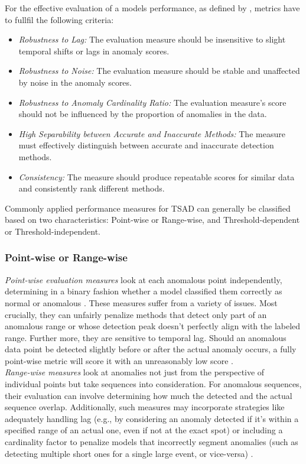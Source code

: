 \documentclass[12pt,oneside]{article}
\begin{document}
For the effective evaluation of a models performance, as defined by \cite{papaVus}, metrics have to fullfil the following criteria:
\begin{itemize}
    \item \textit{Robustness to Lag:} The evaluation measure should be insensitive to slight temporal shifts or lags in anomaly scores.
    \item \textit{Robustness to Noise:} The evaluation measure should be stable and unaffected by noise in the anomaly scores.
    \item \textit{Robustness to Anomaly Cardinality Ratio:} The evaluation measure's score should not be influenced by the proportion of anomalies in the data.
    \item \textit{High Separability between Accurate and Inaccurate Methods:} The measure must effectively distinguish between accurate and inaccurate detection methods.
    \item \textit{Consistency:} The measure should produce repeatable scores for similar data and consistently rank different methods.
\end{itemize}
Commonly applied performance measures for TSAD can generally be classified based on two characteristics: Point-wise or Range-wise, and Threshold-dependent or Threshold-independent.


\subsubsection{Point-wise or Range-wise}
\textit{Point-wise evaluation measures} look at each anomalous point independently, determining in a binary fashion whether a model classified them correctly as normal or anomalous \parencite[p.~7]{liu2024elephant}. These measures suffer from a variety of issues. Most crucially, they can unfairly penalize methods that detect only part of an anomalous range or whose detection peak doesn't perfectly align with the labeled range. Further more, they are sensitive to temporal lag. Should an anomalous data point be detected slightly before or after the actual anomaly occurs, a fully point-wise metric will score it with an unreasonably low score \parencites[p.~2778]{papaVus}.\\ \textit{Range-wise measures} look at anomalies not just from the perspective of individual points but take sequences into consideration. For anomalous sequences, their evaluation can involve determining how much the detected and the actual sequence overlap. Additionally, such measures may incorporate strategies like adequately handling lag (e.g., by considering an anomaly detected if it's within a specified range of an actual one, even if not at the exact spot) or including a cardinality factor to penalize models that incorrectly segment anomalies (such as detecting multiple short ones for a single large event, or vice-versa) \parencite[p.~7]{liu2024elephant}.
\end{document}
